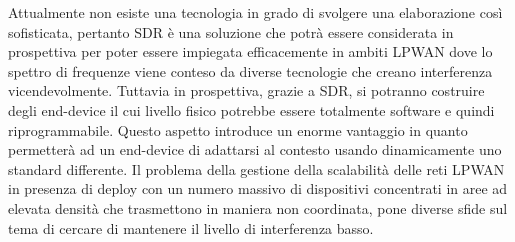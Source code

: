 \documentclass[12pt,a4paper,openright,twoside]{report}
\begin{document}
Attualmente non esiste una tecnologia in grado di svolgere una elaborazione cos\`i sofisticata, pertanto SDR \`e una soluzione che potr\`a essere considerata in prospettiva per poter essere impiegata efficacemente in ambiti LPWAN dove lo spettro di frequenze viene conteso da diverse tecnologie che creano interferenza vicendevolmente. 
Tuttavia in prospettiva, grazie a SDR, si potranno costruire degli end-device il cui livello fisico potrebbe essere totalmente software e quindi riprogrammabile. Questo aspetto introduce un enorme vantaggio in quanto permetter\`a ad un end-device di adattarsi al contesto usando dinamicamente uno standard differente. 
Il problema della gestione della scalabilit\`a delle reti LPWAN in presenza di deploy con un numero massivo di dispositivi concentrati in aree ad elevata densit\`a che trasmettono in maniera non coordinata, pone diverse sfide sul tema di cercare di mantenere il livello di interferenza basso. 
\end{document}
